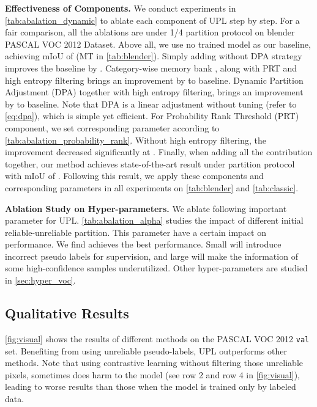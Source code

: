 \documentclass[10pt, twocolumn, letterpaper]{article}
\begin{document}
\noindent \textbf{Effectiveness of Components.} We conduct experiments in \cref{tab:abalation_dynamic} to ablate each component of UPL step by step. 
For a fair comparison, all the ablations are under 1/4 partition protocol on blender PASCAL VOC 2012 Dataset. 
Above all, we use no  trained model as our baseline, achieving mIoU of  (MT in \cref{tab:blender}).
Simply adding  without DPA strategy improves the baseline by .
Category-wise memory bank , along with PRT and high entropy filtering brings an improvement by  to baseline.
Dynamic Partition Adjustment (DPA) together with high entropy filtering, brings an improvement by  to baseline.
Note that DPA is a linear adjustment without tuning (refer to \cref{eq:dpa}), which is simple yet efficient.
For Probability Rank Threshold (PRT) component, we set corresponding parameter according to \cref{tab:abalation_probability_rank}. 
Without high entropy filtering, the improvement decreased significantly at .
Finally, when adding all the contribution together, our method achieves state-of-the-art result under  partition protocol with mIoU of .
Following this result, we apply these components and corresponding parameters in all experiments on \cref{tab:blender} and \cref{tab:classic}.




\noindent \textbf{Ablation Study on Hyper-parameters.}
We ablate following important parameter for UPL. 
\cref{tab:abalation_alpha} studies the impact of different initial reliable-unreliable partition.
This parameter  have a certain impact on performance. We find  achieves the best performance.
Small  will introduce incorrect pseudo labels for supervision, and large  will make the information of some high-confidence samples underutilized.
Other hyper-parameters are studied in \cref{sec:hyper_voc}.








\subsection{Qualitative Results}


\cref{fig:visual} shows the results of different methods on the PASCAL VOC 2012 \texttt{val} set.
Benefiting from using unreliable pseudo-labels, UPL outperforms other methods.
Note that using contrastive learning without filtering those unreliable pixels, sometimes does harm to the model (see row 2 and row 4 in \cref{fig:visual}), leading to worse results than those when the model is trained only by labeled data.
\end{document}
